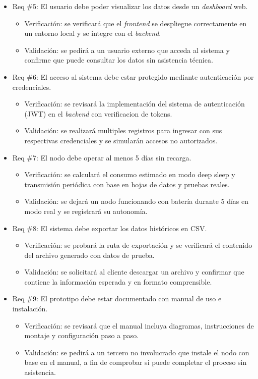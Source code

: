 \documentclass[
11pt, %
]{charter}
\begin{document}
\begin{itemize}
\item Req \#5: El usuario debe poder visualizar los datos desde un \textit{dashboard} web.
\begin{itemize}
	\item Verificación: se verificará que el \textit{frontend} se despliegue correctamente en un entorno local y se integre con el \textit{backend}.
	\item Validación: se pedirá a un usuario externo que acceda al sistema y confirme que puede consultar los datos sin 
    asistencia técnica.
\end{itemize}

\item Req \#6: El acceso al sistema debe estar protegido mediante autenticación por credenciales.
\begin{itemize}
	\item Verificación: se revisará la implementación del sistema de autenticación (JWT) en el \textit{backend} con verificacion de tokens. 
	\item Validación: se realizará multiples registros para ingresar con sus respectivas credenciales y se simularán accesos 
    no autorizados.
\end{itemize}

\item Req \#7: El nodo debe operar al menos 5 días sin recarga.
\begin{itemize}
	\item Verificación: se calculará el consumo estimado en modo deep sleep y transmisión periódica con base en hojas de datos 
    y pruebas reales.
	\item Validación: se dejará un nodo funcionando con batería durante 5 días en modo real y se registrará su autonomía.
\end{itemize}

\item Req \#8: El sistema debe exportar los datos históricos en CSV.
\begin{itemize}
	\item Verificación: se probará la ruta de exportación y se verificará el contenido del archivo generado con datos de prueba.
	\item Validación: se solicitará al cliente descargar un archivo y confirmar que contiene la información esperada y en 
    formato comprensible.
\end{itemize}

\item Req \#9: El prototipo debe estar documentado con manual de uso e instalación.
\begin{itemize}
	\item Verificación: se revisará que el manual incluya diagramas, instrucciones de montaje y configuración paso a paso.
	\item Validación: se pedirá a un tercero no involucrado que instale el nodo con base en el manual, a fin de comprobar si puede 
    completar el proceso sin asistencia.
\end{itemize}


\end{itemize}
\end{document}
